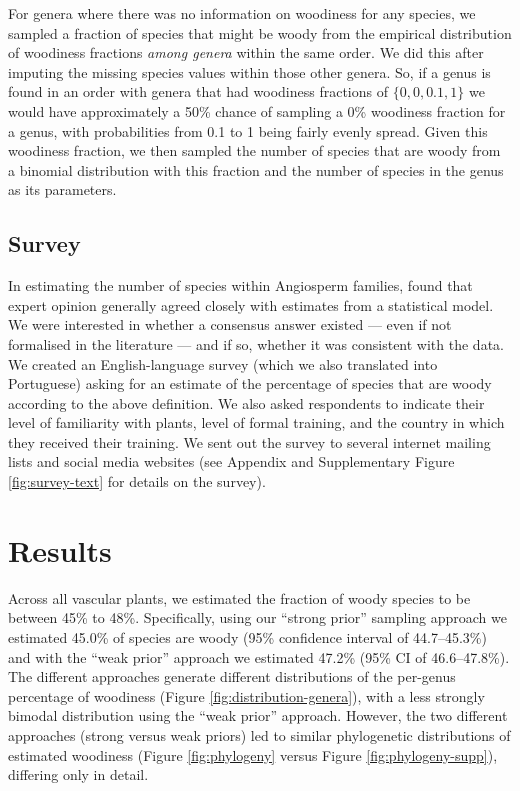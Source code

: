 \documentclass[a4paper,12pt]{article}
\begin{document}
For genera where there was no information on woodiness for any
species, we sampled a fraction of species that might be woody from the
empirical distribution of woodiness fractions \textit{among genera}
within the same order. We did this after imputing the missing species
values within those other genera. So, if a genus is found in an order
with genera that had woodiness fractions of $\{0, 0, 0.1, 1\}$ we would
have approximately a 50\% chance of sampling a 0\% woodiness fraction
for a genus, with probabilities from 0.1 to 1 being fairly evenly
spread.  Given this woodiness fraction, we then sampled the number of
species that are woody from a binomial distribution with this fraction
and the number of species in the genus as its parameters.

\subsection{Survey}

%
In estimating the number of species within Angiosperm families,
\citet{joppa2010} found that expert opinion generally agreed closely
with estimates from a statistical model.  We were interested in
whether a consensus answer existed --- even if not formalised in the
literature --- and if so, whether it was consistent with the data.
% 
We created an English-language survey (which we also translated into
Portuguese) asking for an estimate of the percentage of species that
are woody according to the above definition.  We also asked
respondents to indicate their level of familiarity with plants, level
of formal training, and the country in which they received their
training. We sent out the survey to several internet mailing lists and
social media websites (see Appendix and Supplementary Figure
\ref{fig:survey-text} for details on the survey).

\section{Results}

Across all vascular plants, we estimated the fraction of woody species
to be between 45\% to 48\%.
Specifically, using our ``strong prior'' sampling approach we
estimated 45.0\% of species are woody (95\% confidence interval of
44.7--45.3\%) and with the ``weak prior'' approach we estimated 47.2\%
(95\% CI of 46.6--47.8\%).
The different approaches generate different distributions of the
per-genus percentage of woodiness (Figure
\ref{fig:distribution-genera}), with a less strongly bimodal
distribution using the ``weak prior'' approach.  However, the two different approaches (strong
versus weak priors) led to similar phylogenetic distributions of
estimated woodiness (Figure \ref{fig:phylogeny} versus Figure
\ref{fig:phylogeny-supp}), differing only in detail.
\end{document}
